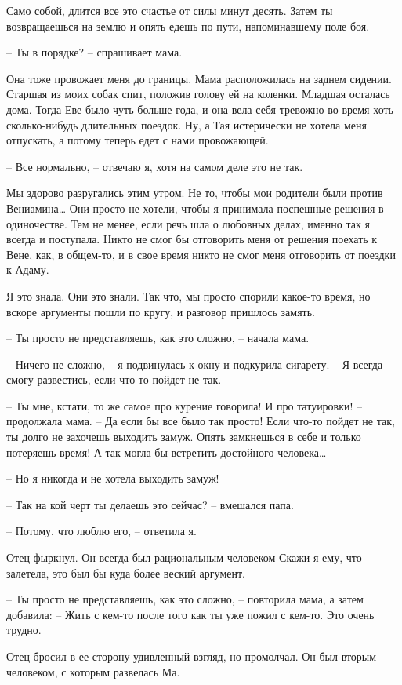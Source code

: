 \documentclass[
]{book}
\begin{document}
Само собой, длится все это счастье от силы минут десять. Затем ты возвращаешься на землю и опять едешь по пути, напоминавшему поле боя.

-- Ты в порядке? -- спрашивает мама.

Она тоже провожает меня до границы. Мама расположилась на заднем сидении. Старшая из моих собак спит, положив голову ей на коленки. Младшая осталась дома. Тогда Еве было чуть больше года, и она вела себя тревожно во время хоть сколько-нибудь длительных поездок. Ну, а Тая истерически не хотела меня отпускать, а потому теперь едет с нами провожающей.

-- Все нормально, -- отвечаю я, хотя на самом деле это не так.

Мы здорово разругались этим утром. Не то, чтобы мои родители были против Вениамина\ldots{} Они просто не хотели, чтобы я принимала поспешные решения в одиночестве. Тем не менее, если речь шла о любовных делах, именно так я всегда и поступала. Никто не смог бы отговорить меня от решения поехать к Вене, как, в общем-то, и в свое время никто не смог меня отговорить от поездки к Адаму.

Я это знала. Они это знали. Так что, мы просто спорили какое-то время, но вскоре аргументы пошли по кругу, и разговор пришлось замять.

-- Ты просто не представляешь, как это сложно, -- начала мама.

-- Ничего не сложно, -- я подвинулась к окну и подкурила сигарету. -- Я всегда смогу развестись, если что-то пойдет не так.

-- Ты мне, кстати, то же самое про курение говорила! И про татуировки! -- продолжала мама. -- Да если бы все было так просто! Если что-то пойдет не так, ты долго не захочешь выходить замуж. Опять замкнешься в себе и только потеряешь время! А так могла бы встретить достойного человека\ldots{}

-- Но я никогда и не хотела выходить замуж!

-- Так на кой черт ты делаешь это сейчас? -- вмешался папа.

-- Потому, что люблю его, -- ответила я.

Отец фыркнул. Он всегда был рациональным человеком Скажи я ему, что залетела, это был бы куда более веский аргумент.

-- Ты просто не представляешь, как это сложно, -- повторила мама, а затем добавила: -- Жить с кем-то после того как ты уже пожил с кем-то. Это очень трудно.

Отец бросил в ее сторону удивленный взгляд, но промолчал. Он был вторым человеком, с которым развелась Ма.
\end{document}
